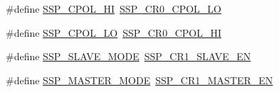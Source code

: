 \begin{DoxyCompactItemize}
$$\item 
\#define \hyperlink{group__SSP__17XX__40XX_gaf64aec37a92ca6c14c23af6fc0052ccb}{S\-S\-P\-\_\-\-C\-P\-O\-L\-\_\-\-H\-I}~\hyperlink{group__SSP__17XX__40XX_gab4353fed07ef845a3796e154397f7e76}{S\-S\-P\-\_\-\-C\-R0\-\_\-\-C\-P\-O\-L\-\_\-\-L\-O}
\item 
\#define \hyperlink{group__SSP__17XX__40XX_ga1e10eccdb2b293607764028aab1b98a9}{S\-S\-P\-\_\-\-C\-P\-O\-L\-\_\-\-L\-O}~\hyperlink{group__SSP__17XX__40XX_ga36d7ad75edb14d318d710f964384f466}{S\-S\-P\-\_\-\-C\-R0\-\_\-\-C\-P\-O\-L\-\_\-\-H\-I}
\item 
\#define \hyperlink{group__SSP__17XX__40XX_gac6bc4b92810caa934b2d7116390098c6}{S\-S\-P\-\_\-\-S\-L\-A\-V\-E\-\_\-\-M\-O\-D\-E}~\hyperlink{group__SSP__17XX__40XX_ga483d570ffc25bc917c99b3e8ece75649}{S\-S\-P\-\_\-\-C\-R1\-\_\-\-S\-L\-A\-V\-E\-\_\-\-E\-N}
\item 
\#define \hyperlink{group__SSP__17XX__40XX_ga3c9cbd4f4b8169253d26f4d40cdc414d}{S\-S\-P\-\_\-\-M\-A\-S\-T\-E\-R\-\_\-\-M\-O\-D\-E}~\hyperlink{group__SSP__17XX__40XX_gaa8e064b00be6db00e597ad2509a633c3}{S\-S\-P\-\_\-\-C\-R1\-\_\-\-M\-A\-S\-T\-E\-R\-\_\-\-E\-N}
\end{DoxyCompactItemize}
